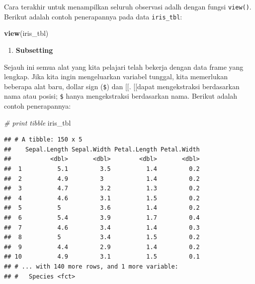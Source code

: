\documentclass[]{book}
\newenvironment{Shaded}{\begin{snugshade}}{\end{snugshade}}
\newcommand{\KeywordTok}[1]{\textcolor[rgb]{0.13,0.29,0.53}{\textbf{#1}}}
\newcommand{\CommentTok}[1]{\textcolor[rgb]{0.56,0.35,0.01}{\textit{#1}}}
\newcommand{\OperatorTok}[1]{\textcolor[rgb]{0.81,0.36,0.00}{\textbf{#1}}}
\newcommand{\NormalTok}[1]{#1}
\providecommand{\tightlist}{%
  \setlength{\itemsep}{0pt}\setlength{\parskip}{0pt}}
\begin{document}
Cara terakhir untuk menampilkan seluruh observasi adalh dengan fungsi
\texttt{view()}. Berikut adalah contoh penerapannya pada data
\texttt{iris\_tbl}:

\begin{Shaded}
\begin{Highlighting}[]
\KeywordTok{view}\NormalTok{(iris_tbl)}
\end{Highlighting}
\end{Shaded}

\begin{enumerate}
\def\labelenumi{\alph{enumi}.}
\setcounter{enumi}{1}
\tightlist
\item
  \textbf{Subsetting}
\end{enumerate}

Sejauh ini semua alat yang kita pelajari telah bekerja dengan data frame
yang lengkap. Jika kita ingin mengeluarkan variabel tunggal, kita
memerlukan beberapa alat baru, dollar sign (\texttt{\$}) dan {[}{[}.
{[}{[}dapat mengekstraksi berdasarkan nama atau posisi; \texttt{\$}
hanya mengekstraksi berdasarkan nama. Berikut adalah contoh
penerapannya:

\begin{Shaded}
\begin{Highlighting}[]
\CommentTok{# print tibble}
\NormalTok{iris_tbl}
\end{Highlighting}
\end{Shaded}

\begin{verbatim}
## # A tibble: 150 x 5
##    Sepal.Length Sepal.Width Petal.Length Petal.Width
##           <dbl>       <dbl>        <dbl>       <dbl>
##  1          5.1         3.5          1.4         0.2
##  2          4.9         3            1.4         0.2
##  3          4.7         3.2          1.3         0.2
##  4          4.6         3.1          1.5         0.2
##  5          5           3.6          1.4         0.2
##  6          5.4         3.9          1.7         0.4
##  7          4.6         3.4          1.4         0.3
##  8          5           3.4          1.5         0.2
##  9          4.4         2.9          1.4         0.2
## 10          4.9         3.1          1.5         0.1
## # ... with 140 more rows, and 1 more variable:
## #   Species <fct>
\end{verbatim}

\begin{Shaded}
\end{Shaded}
\end{document}
